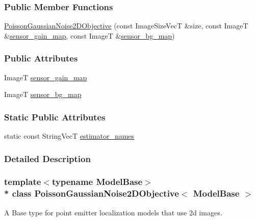 \subsubsection*{Public Member Functions}
\begin{DoxyCompactItemize}
\item 
\hyperlink{classPoissonGaussianNoise2DObjective_ac7f39bbac0ce14092aa82f59fd4b697a}{Poisson\+Gaussian\+Noise2\+D\+Objective} (const Image\+Size\+VecT \&size, const ImageT \&\hyperlink{classPoissonGaussianNoise2DObjective_aa28337c212470a6a5a152e691bcb7d45}{sensor\+\_\+gain\+\_\+map}, const ImageT \&\hyperlink{classPoissonGaussianNoise2DObjective_a84c763dc1db0d927cc1f8bcecdb3b663}{sensor\+\_\+bg\+\_\+map})
\end{DoxyCompactItemize}
\subsubsection*{Public Attributes}
\begin{DoxyCompactItemize}
\item 
ImageT \hyperlink{classPoissonGaussianNoise2DObjective_aa28337c212470a6a5a152e691bcb7d45}{sensor\+\_\+gain\+\_\+map}
\item 
ImageT \hyperlink{classPoissonGaussianNoise2DObjective_a84c763dc1db0d927cc1f8bcecdb3b663}{sensor\+\_\+bg\+\_\+map}
\end{DoxyCompactItemize}
\subsubsection*{Static Public Attributes}
\begin{DoxyCompactItemize}
\item 
static const String\+VecT \hyperlink{classPoissonGaussianNoise2DObjective_afc77f6a06f55c371a831f9e1ecc82ee3}{estimator\+\_\+names}
\end{DoxyCompactItemize}


\subsubsection{Detailed Description}
\subsubsection*{template$<$typename Model\+Base$>$\\*
class Poisson\+Gaussian\+Noise2\+D\+Objective$<$ Model\+Base $>$}

A Base type for point emitter localization models that use 2d images. 

